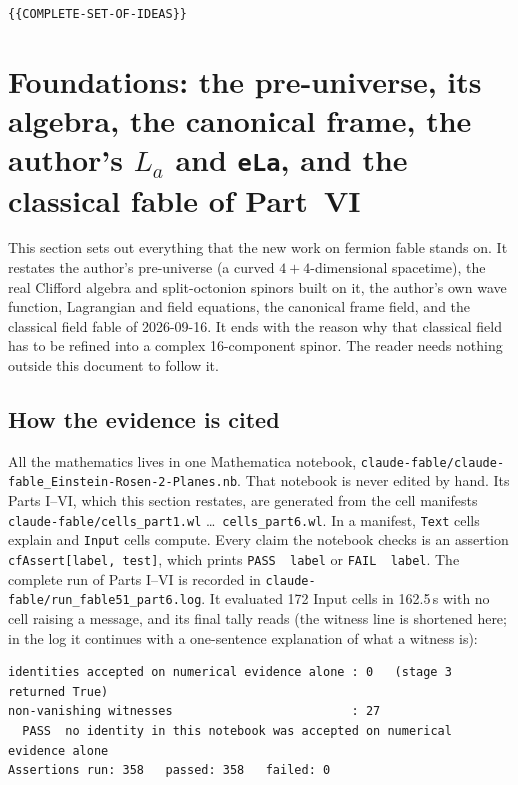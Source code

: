 \texttt{\{\{COMPLETE-SET-OF-IDEAS\}\}}

\begingroup\sloppy

\section[Foundations: the pre-universe, its algebra, the canonical frame, the author's La and eLa, and the classical fable of Part VI]{Foundations: the pre-universe, its algebra, the canonical frame, the author's \texorpdfstring{$L_a$}{La} and \texttt{eLa}, and the classical fable of Part~VI}
\label{fnd:sec}\label{sec:2}

This section sets out everything that the new work on fermion fable stands on. It restates the
author's pre-universe (a curved $4+4$-dimensional spacetime), the real Clifford algebra and
split-octonion spinors built on it, the author's own wave function, Lagrangian and field
equations, the canonical frame field, and the classical field fable of 2026-09-16. It ends with
the reason why that classical field has to be refined into a complex 16-component spinor. The
reader needs nothing outside this document to follow it.

\subsection{How the evidence is cited}
\label{fnd:evidence}\label{sec:2.1}

All the mathematics lives in one Mathematica notebook,
\texttt{claude-fable/claude-fable\_Einstein-Rosen-2-Planes.nb}. That notebook is never edited by
hand. Its Parts I--VI, which this section restates, are generated from the cell manifests
\texttt{claude-fable/cells\_part1.wl} \dots\ \texttt{cells\_part6.wl}. In a manifest,
\texttt{Text} cells explain and \texttt{Input} cells compute. Every claim the notebook checks is
an assertion \texttt{cfAssert[label, test]}, which prints \texttt{PASS~~label} or
\texttt{FAIL~~label}. The complete run of Parts I--VI is recorded in
\texttt{claude-fable/run\_fable51\_part6.log}. It evaluated 172 Input cells in 162.5\,s with no
cell raising a message, and its final tally reads (the witness line is shortened here; in the
log it continues with a one-sentence explanation of what a witness is):
\begin{footnotesize}
\begin{verbatim}
identities accepted on numerical evidence alone : 0   (stage 3 returned True)
non-vanishing witnesses                         : 27
  PASS  no identity in this notebook was accepted on numerical evidence alone
Assertions run: 358   passed: 358   failed: 0
\end{verbatim}
\end{footnotesize}

